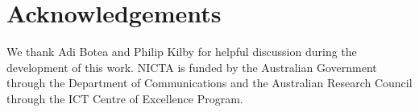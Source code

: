 \section{Acknowledgements}
\label{sec::ack}
We thank Adi Botea and Philip Kilby for helpful discussion during the
development of this work.  NICTA is funded by the Australian Government
through the Department of Communications and the Australian Research Council
through the ICT Centre of Excellence Program.
